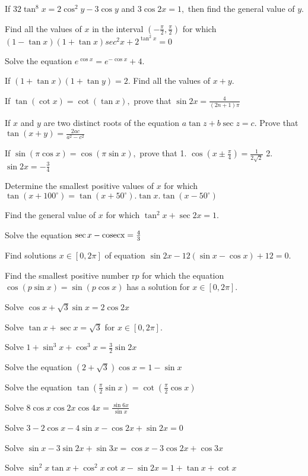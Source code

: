 \item If $32\tan^8x = 2\cos^2y - 3\cos y$ and $3\cos2x = 1,$ then find the general value of $y.$
\item Find all the values of $x$ in the interval $\left(-\frac{\pi}{2}, \frac{\pi}{2}\right)$ for which $(1 - \tan
    x)(1 + \tan x)sec^2x + 2^{\tan^2x} = 0$
\item Solve the equation $e^{\cos x} = e^{-\cos x} + 4.$
\item If $(1 + \tan x)(1 + \tan y) = 2.$ Find all the values of $x + y.$
\item If $\tan(\cot x) = \cot(\tan x),$ prove that $\sin 2x = \frac{4}{(2n + 1)\pi}$
\item If $x$ and $y$ are two distinct roots of the equation $a\tan z+ b\sec z = c.$ Prove that $\tan(x + y) =
    \frac{2ac}{a^2 - c^2}$
\item If $\sin(\pi\cos x) = \cos(\pi\sin x),$ prove that
    1. $\cos\left(x \pm \frac{\pi}{4}\right) = \frac{1}{2\sqrt{2}}$
    2. $\sin2x =  -\frac{3}{4}$
\item Determine the smallest positive values of $x$ for which $\tan(x + 100^\circ) = \tan(x + 50^\circ).\tan x.\tan(x -
    50^\circ)$
\item Find the general value of $x$ for which $\tan^2x + \sec 2x = 1.$
\item Solve the equation $\sec x - \rm cosec x = \frac{4}{3}$
\item Find solutions $x\in[0, 2\pi]$ of equation $\sin2x - 12(\sin x - \cos x) + 12 = 0.$
\item Find the smallest positive number r$p$ for which the equation $\cos(p\sin x) = \sin(p\cos x)$ has a solution for
    $x\in [0, 2\pi].$
\item Solve $\cos x + \sqrt{3}\sin x = 2\cos2x$
\item Solve $\tan x+ \sec x = \sqrt{3}$ for $x\in[0, 2\pi].$
\item Solve $1 + \sin^3x + \cos^3x = \frac{3}{2}\sin2x$
\item Solve the equation $(2 + \sqrt{3})\cos x = 1 - \sin x$
\item Solve the equation $\tan\left(\frac{\pi}{2}\sin x\right) = \cot\left(\frac{\pi}{2}\cos x\right)$
\item Solve $8\cos x\cos2x\cos4x = \frac{\sin6x}{\sin x}$
\item Solve $3 - 2\cos x - 4\sin x -\cos 2x + \sin 2x = 0$
\item Solve $\sin x - 3\sin 2x + \sin 3x = \cos x - 3\cos 2x + \cos 3x$
\item Solve $\sin^2x\tan x + \cos^2x\cot x - \sin 2x = 1 + \tan x + \cot x$
